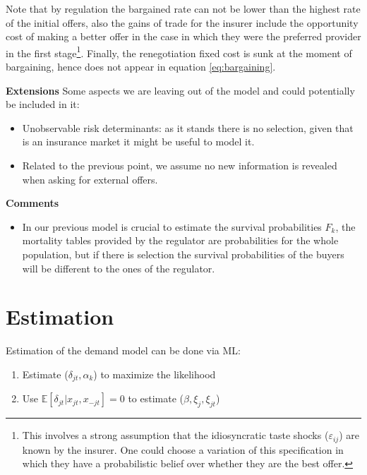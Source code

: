 \documentclass[12pt]{article}
\theoremstyle{plain}
\theoremstyle{plain}
\begin{document}


Note that by regulation the bargained rate can not be lower than the highest rate of the initial offers, also the gains of trade for the insurer include the opportunity cost of making a better offer in the case in which they were the preferred provider in the first stage\footnote{This involves a strong assumption that the idiosyncratic taste shocks ($\varepsilon_{ij}$) are known by the insurer. One could choose a variation of this specification in which they have a probabilistic belief over whether they are the best offer. }. Finally, the renegotiation fixed cost is sunk at the moment of bargaining, hence does not appear in equation \ref{eq:bargaining}. 

 




\textbf{Extensions}
Some aspects we are leaving out of the model and could potentially be included in it: 
\begin{itemize}
    \item Unobservable risk determinants: as it stands there is no selection, given that is an insurance market it might be useful to model it.

    \item Related to the previous point, we assume no new information is revealed when asking for external offers.
\end{itemize}



\textbf{Comments}
\begin{itemize}
    \item In our previous model is crucial to estimate the survival probabilities $F_k$, the mortality tables provided by the regulator are probabilities for the whole population, but if there is selection the survival probabilities of the buyers will be different to the ones of the regulator. 
\end{itemize}


\section{Estimation}
Estimation of the demand model can be done via ML: 
\begin{enumerate}
    \item Estimate  ($\delta_{jt}, \alpha_k$) to maximize the likelihood 
    \item Use $\mathbb{E}[\delta_{jt}|x_{jt},x_{-jt}]= 0$ to estimate ($\beta, \xi_j, \xi_{jt}$)
\end{enumerate}
\end{document}
